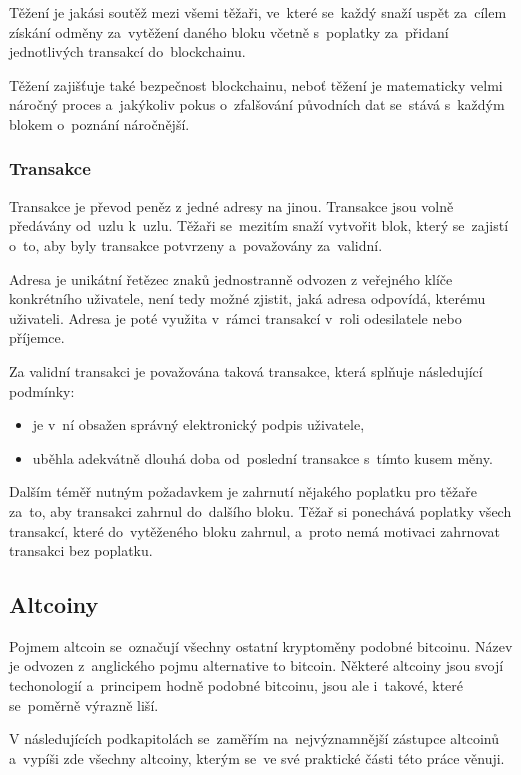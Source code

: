 \documentclass[thesis=B,czech]{FITthesis}[2019/03/21]
\begin{document}
Těžení je jakási soutěž mezi všemi těžaři, ve~které se~každý snaží uspět za~cílem získání odměny za~vytěžení daného bloku včetně s~poplatky za~přidaní jednotlivých transakcí do~blockchainu.

Těžení zajišťuje také bezpečnost blockchainu, neboť těžení je matematicky velmi náročný proces a~jakýkoliv pokus o~zfalšování původních dat se~stává s~každým blokem o~poznání náročnější. \cite{mastering_bitcoin}

\subsubsection{Transakce}
Transakce je převod peněz z jedné adresy na jinou. Transakce jsou volně předávány od~uzlu k~uzlu. Těžaři se~mezitím snaží vytvořit blok, který se~zajistí o~to, aby byly transakce potvrzeny a~považovány za~validní.

Adresa je unikátní řetězec znaků jednostranně odvozen z veřejného klíče konkrétního uživatele, není tedy možné zjistit, jaká adresa odpovídá, kterému uživateli. Adresa je poté využita v~rámci transakcí v~roli odesilatele nebo příjemce. \cite{mastering_bitcoin}

Za validní transakci je považována taková transakce, která splňuje \linebreak následující podmínky:
\begin{itemize}
    \item je v~ní obsažen správný elektronický podpis uživatele,
    \item uběhla adekvátně dlouhá doba od~poslední transakce s~tímto kusem měny. \cite{Finex_blockchain}
\end{itemize}
Dalším téměř nutným požadavkem je zahrnutí nějakého poplatku pro těžaře za~to, aby transakci zahrnul do~dalšího bloku. Těžař si ponechává poplatky všech transakcí, které do~vytěženého bloku zahrnul, a~proto nemá motivaci zahrnovat transakci bez poplatku. \cite{Finex_blockchain}

\subsection{Altcoiny}
Pojmem altcoin se~označují všechny ostatní kryptoměny podobné bitcoinu. Název je odvozen z~anglického pojmu alternative to bitcoin. Některé altcoiny jsou svojí techonologií a~principem hodně podobné bitcoinu, jsou ale i~takové, které se~poměrně výrazně liší. \cite{pecev}

V následujících podkapitolách se~zaměřím na~nejvýznamnější zástupce altcoinů a~vypíši zde všechny altcoiny, kterým se~ve své praktické části této práce věnuji.
\end{document}

